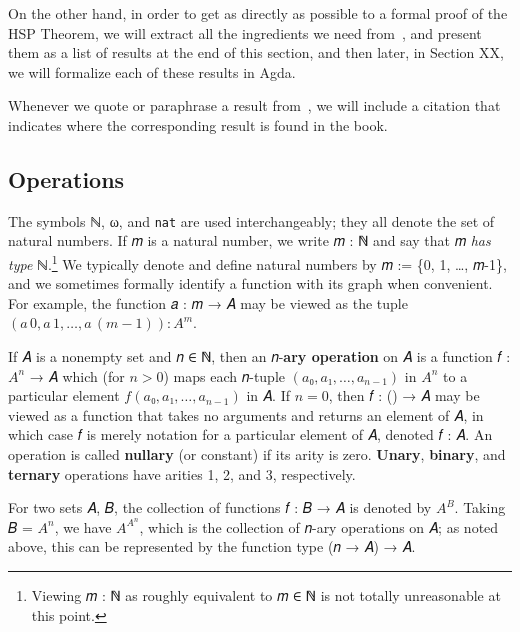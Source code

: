 \documentclass[sigplan,screen]{acmart}
\begin{document}
On the other hand, in order to get as directly as possible to a formal proof of the HSP Theorem, we will extract all the ingredients we need from~\cite{Bergman:2012}, and present them as a list of results at the end of this section, and then later, in Section XX, we will formalize each of these results in Agda.

Whenever we quote or paraphrase a result from~\cite{Bergman:2012}, we will include a citation that indicates where the corresponding result is found in the book.

\subsection{Operations}\label{operations}
The symbols ℕ, ω, and \texttt{nat} are used interchangeably; they all denote the set of natural numbers. If 𝑚 is a natural number, we write 𝑚 : ℕ and say that 𝑚 \emph{has type} ℕ.\footnote{Viewing 𝑚 : ℕ as roughly equivalent to 𝑚 ∈ ℕ is not totally unreasonable at this point.} We typically denote and define natural numbers by 𝑚 := \{0, 1, \ldots, 𝑚-1\}, and we sometimes formally identify a function with its graph when convenient. For example, the function 𝑎 : 𝑚 → 𝐴 may be viewed as the tuple \((𝑎\,0, 𝑎\,1, …, 𝑎\,(𝑚-1)) : 𝐴^m\).

If 𝐴 is a nonempty set and 𝑛 ∈ ℕ, then an 𝑛-\textbf{ary operation} on 𝐴 is a function 𝑓 : \ensuremath{𝐴^n} → 𝐴 which (for \(𝑛 > 0\)) maps each 𝑛-tuple \((𝑎₀, 𝑎₁, …, 𝑎_{n-1})\) in \ensuremath{𝐴^n} to a particular element \(𝑓(𝑎₀, 𝑎₁, …, 𝑎_{n-1})\) in 𝐴. If \(𝑛 = 0\), then 𝑓 : () → 𝐴 may be viewed as a function that takes no arguments and returns an element of 𝐴, in which case 𝑓 is merely notation for a particular element of 𝐴, denoted 𝑓 : 𝐴.
An operation is called \textbf{nullary} (or constant) if its arity is zero. \textbf{Unary}, \textbf{binary}, and \textbf{ternary} operations have arities 1, 2, and 3, respectively.

For two sets 𝐴, 𝐵, the collection of functions 𝑓 : 𝐵 → 𝐴 is denoted by \(A^B\). Taking 𝐵 = \ensuremath{𝐴^n}, we have \(A^{A^n}\), which is the collection of 𝑛-ary operations on 𝐴; as noted above, this can be represented by the function type (𝑛 → 𝐴) → 𝐴.
\end{document}
